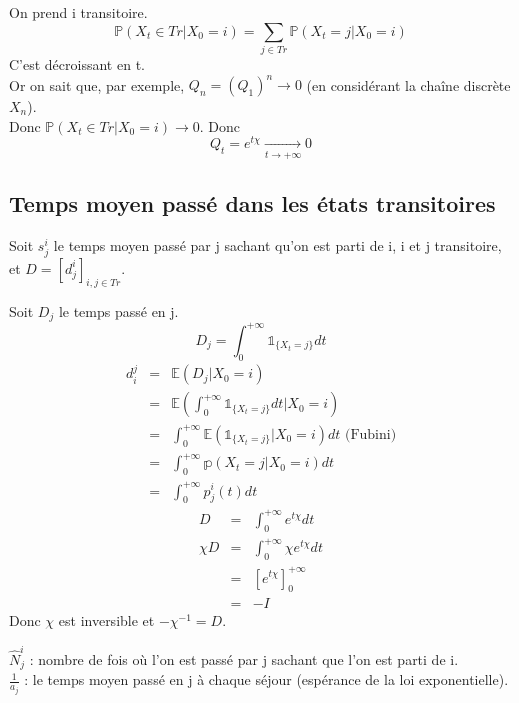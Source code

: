\Theo{}{\[Q=e^{t\chi}\xrightarrow[t\to+\infty]{} 0\]}
\begin{dem}
On prend i transitoire.
\[\mathbb{P}(X_t\in Tr|X_0=i)=\sum_{j\in Tr} \mathbb{P}(X_t=j|X_0=i)\]
C'est décroissant en t.\\
Or on sait que, par exemple, $Q_n=(Q_1)^n\to 0$ (en considérant la chaîne discrète $X_n$).\\
Donc $\mathbb{P}(X_t\in Tr|X_0=i)\to 0$. Donc
	\[Q_t=e^{t\chi}\xrightarrow[t\to+\infty]{}0\]
\end{dem}

\subsection{Temps moyen passé dans les états transitoires}
Soit $s^i_j$ le temps moyen passé par j sachant qu'on est parti de i, i et j transitoire, et $D=[d_j^i]_{i,j\in Tr}$. 

\begin{dem}
Soit $D_j$ le temps passé en j.
\[D_j=\int_0^{+\infty} \mathds{1}_{\{X_t=j\}}dt\]
\begin{eqnarray*}
d_i^j&=&\mathbb{E}(D_j|X_0=i)\\
	&=&\mathbb{E}(\int_0^{+\infty} \mathds{1}_{\{X_t=j\}}dt|X_0=i)\\
	&=&\int_0^{+\infty} \mathbb{E}(\mathds{1}_{\{X_t=j\}}|X_0=i)dt \text{ (Fubini)}\\
	&=&\int_0^{+\infty} \mathbb{p}(X_t=j|X_0=i)dt\\
	&=&\int_0^{+\infty} p_j^i(t)dt
\end{eqnarray*}
\begin{eqnarray*}
D&=&\int_0^{+\infty} e^{t\chi} dt\\
\chi D&=&\int_0^{+\infty} \chi e^{t\chi} dt\\
	&=&[e^{t\chi}]_0^{+\infty}\\
	&=& -I
\end{eqnarray*}
Donc $\chi$ est inversible et $-\chi^{-1}=D$.
\end{dem}


$\hat{N}_j^i$ : nombre de fois où l'on est passé par j sachant que l'on est parti de i.\\
$\frac{1}{a_j}$ : le temps moyen passé en j à chaque séjour (espérance de la loi exponentielle).

